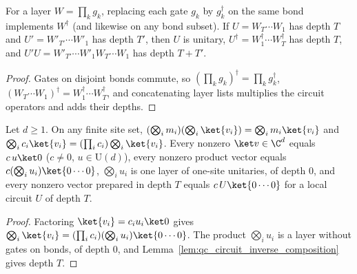 \begin{lemma}
    \label{lem:qc_circuit_inverse_composition}
    \leanok
    For a layer $W=\prod_k g_k$, replacing each gate $g_k$ by $g_k^\dagger$ on the same bond implements $W^\dagger$ (and likewise on any bond subset). If $U=W_T\cdots W_1$ has depth $T$ and $U'=W'_{T'}\cdots W'_1$ has depth $T'$, then $U$ is unitary, $U^\dagger=W_1^\dagger\cdots W_T^\dagger$ has depth $T$, and $U'U=W'_{T'}\cdots W'_1 W_T\cdots W_1$ has depth $T+T'$.
\end{lemma}
\begin{proof}
    \leanok
    Gates on disjoint bonds commute, so $(\prod_k g_k)^\dagger=\prod_k g_k^\dagger$, $(W_T\cdots W_1)^\dagger=W_1^\dagger\cdots W_T^\dagger$, and concatenating layer lists multiplies the circuit operators and adds their depths.
\end{proof}

\begin{lemma}
    \label{lem:qc_preparation_from_zero}
    \leanok
    Let $d\ge1$. On any finite site set, $(\bigotimes_i m_i)(\bigotimes_i\ket{v_i})=\bigotimes_i m_i\ket{v_i}$ and $\bigotimes_i c_i\ket{v_i}=(\prod_i c_i)\bigotimes_i\ket{v_i}$. Every nonzero $\ket v\in\C^d$ equals $c\,u\ket 0$ ($c\ne0$, $u\in\mathrm U(d)$), every nonzero product vector equals $c(\bigotimes_i u_i)\ket{0\cdots0}$, $\bigotimes_i u_i$ is one layer of one-site unitaries, of depth $0$, and every nonzero vector prepared in depth $T$ equals $c\,U\ket{0\cdots0}$ for a local circuit $U$ of depth $T$.
\end{lemma}
\begin{proof}
    \leanok
    Factoring $\ket{v_i}=c_iu_i\ket0$ gives $\bigotimes_i\ket{v_i}=(\prod_i c_i)(\bigotimes_i u_i)\ket{0\cdots0}$. The product $\bigotimes_i u_i$ is a layer without gates on bonds, of depth $0$, and Lemma~\ref{lem:qc_circuit_inverse_composition} gives depth $T$.
\end{proof}

